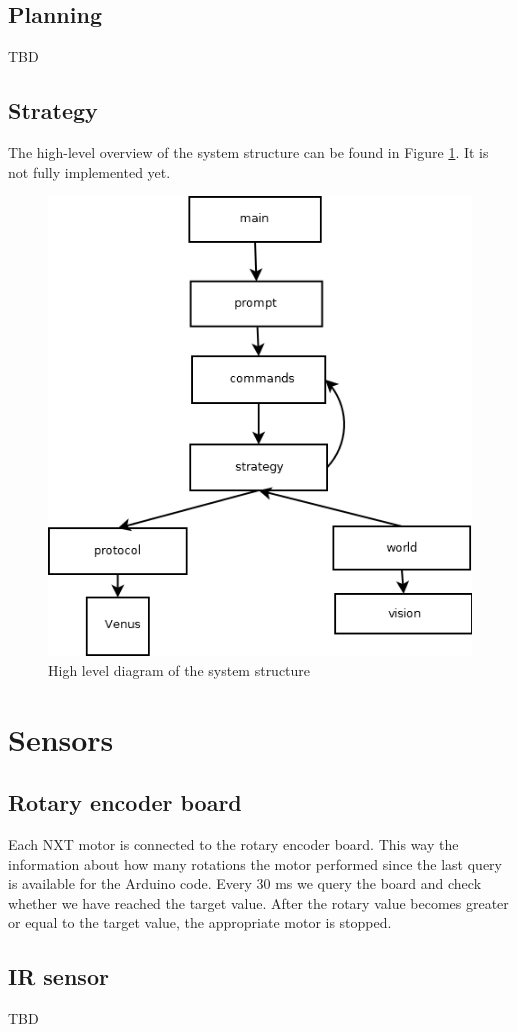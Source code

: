 \documentclass[12pt]{article}
\begin{document}
\subsection{Planning}

TBD

\subsection{Strategy}

The high-level overview of the system structure can be found in Figure \ref{fig:strategy}. It is not fully implemented yet.
\begin{figure}
    \includegraphics[scale=.7]{Diagram2}
    \caption{High level diagram of the system structure}
    \label{fig:strategy}
\end{figure}

\section{Sensors}
\subsection{Rotary encoder board}

Each NXT motor is connected to the rotary encoder board. This way the
information about how many rotations the motor performed since the last query
is available for the Arduino code. Every 30 ms we query the board and
check whether we have reached the target value. After the rotary value becomes
greater or equal to the target value, the appropriate motor is stopped.

\subsection{IR sensor}

TBD
\end{document}

